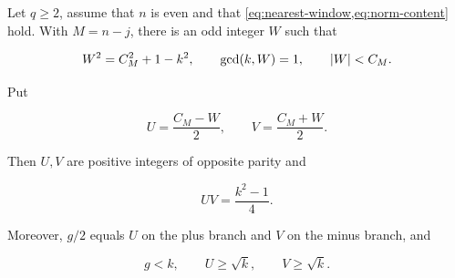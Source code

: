 \begin{lemma}
\label{lem:rectangle}
Let $q\geqslant2$, assume that $n$ is even and that
\cref{eq:nearest-window,eq:norm-content} hold. With $M=n-j$,
there is an odd integer $W$ such that

\begin{equation}
 W^2=C_M^2+1-k^2,
 \qquad
 \gcd(k,W)=1,
 \qquad
 \lvert W\rvert<C_M.
 \label{eq:W-relation}
\end{equation}

Put

\begin{equation}
 U=\frac{C_M-W}{2},
 \qquad
 V=\frac{C_M+W}{2}.
 \label{eq:UV}
\end{equation}

Then $U,V$ are positive integers of opposite parity and

\begin{equation}
 UV=\frac{k^2-1}{4}.
 \label{eq:UV-product}
\end{equation}

Moreover, $g/2$ equals $U$ on the plus branch and $V$ on the minus branch,
and

\begin{equation}
 g<k,
 \qquad
 U\geqslant\sqrt{k},
 \qquad
 V\geqslant\sqrt{k}.
 \label{eq:factor-lower}
\end{equation}
\end{lemma}

